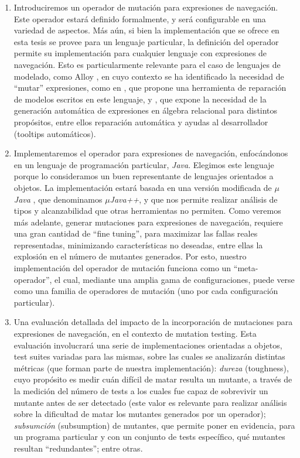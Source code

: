 \begin{enumerate}
	\item Introduciremos un operador de mutaci\'on para expresiones de navegaci\'on. Este operador estar\'a definido formalmente, y ser\'a configurable en una variedad de aspectos. M\'as a\'un, si bien la implementaci\'on que se ofrece en esta tesis se provee para un lenguaje particular, la definici\'on del operador permite su implementaci\'on para cualquier lenguaje con expresiones de navegaci\'on. Esto es particularmente relevante para el caso de lenguajes de modelado, como Alloy \cite{bibliography.books.SoftwareAbstractions-alloy}, en cuyo contexto se ha identificado la necesidad de ``mutar'' expresiones, como en \cite{bibliography.repair.mutation.AlloyWang18}, que propone una herramienta de reparaci\'on de modelos escritos en este lenguaje, y \cite{bibliography.algebraicExpressions.RexGenWang18}, que expone la necesidad de la generaci\'on autom\'atica de expresiones en \'algebra relacional para distintos prop\'ositos, entre ellos reparaci\'on autom\'atica y ayudas al desarrollador (tooltips autom\'aticos).
	
	\item Implementaremos el operador para expresiones de navegaci\'on, enfoc\'andonos en un lenguaje de programaci\'on particular, \emph{Java}. Elegimos este lenguaje porque lo consideramos un buen representante de lenguajes orientados a objetos. La implementaci\'on estar\'a basada en una versi\'on modificada de \emph{$\mu$Java} \cite{bibliography.mutation.tools.muJavaMaOK05}, que denominamos \emph{$\mu$Java++}, y que nos permite realizar an\'alisis de tipos y alcanzabilidad que otras herramientas no permiten. Como veremos m\'as adelante, generar mutaciones para expresiones de navegaci\'on, requiere una gran cantidad de ``fine tuning'', para maximizar las fallas reales representadas, minimizando caracter\'isticas no deseadas, entre ellas la explosi\'on en el n\'umero de mutantes generados. Por esto, nuestro implementaci\'on del operador de mutaci\'on funciona como un ``meta-operador'', el cual, mediante una amplia gama de configuraciones, puede verse como una familia de operadores de mutaci\'on (uno por cada configuraci\'on particular). 

    \item Una evaluaci\'on detallada del impacto de la incorporaci\'on de mutaciones para expresiones de navegaci\'on, en el contexto de mutation testing. Esta evaluaci\'on involucrar\'a una serie de implementaciones orientadas a objetos, test suites variadas para las mismas, sobre las cuales se analizar\'an distintas m\'etricas (que forman parte de nuestra implementaci\'on): \emph{dureza} (toughness), cuyo prop\'osito es medir cu\'an dif\'icil de matar resulta un mutante, a trav\'es de la medici\'on del n\'umero de tests a los cuales fue capaz de sobrevivir un mutante antes de ser detectado (este valor es relevante para realizar an\'alisis sobre la dificultad de matar los mutantes generados por un operador); \emph{subsumci\'on} (subsumption) de mutantes, que permite poner en evidencia, para un programa particular y con un conjunto de tests espec\'ifico, qu\'e mutantes resultan ``redundantes''; entre otras. 


\end{enumerate}
